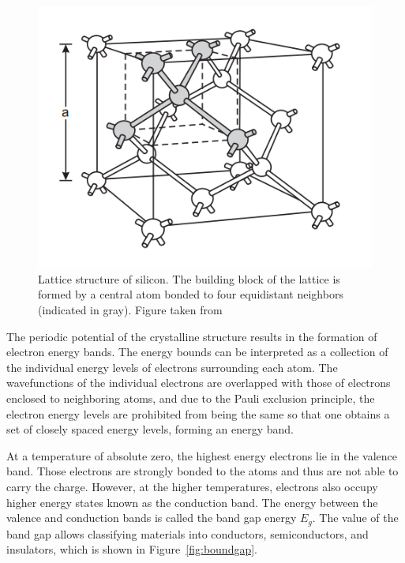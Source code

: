 \begin{figure}[h]
\centering
\includegraphics{figures/silicon.PNG}
\caption{Lattice structure of silicon. The building block of the lattice is formed by a central atom bonded to four
equidistant neighbors (indicated in gray). Figure taken from~\cite{semiconductors_det_sys}}
\label{fig:silicon}
\end{figure}


The periodic potential of the crystalline structure results in the formation of electron energy bands. The energy bounds can be interpreted as a collection of the individual energy levels of electrons surrounding each atom. The wavefunctions of the individual electrons are overlapped with those of electrons enclosed to neighboring atoms, and due to the Pauli exclusion principle, the electron energy levels are prohibited from being the same so that one obtains a set of closely spaced energy levels, forming an energy band. 

At a temperature of absolute zero, the highest energy electrons lie in the valence band. Those electrons are strongly bonded to the atoms and thus are not able to carry the charge.  However, at the higher temperatures, electrons also occupy higher energy states known as the conduction band. The energy between the valence and conduction bands is called the band gap energy $E_g$.  The value of the band gap allows classifying materials into conductors, semiconductors, and insulators, which is shown in Figure~\ref{fig:boundgap}. 


